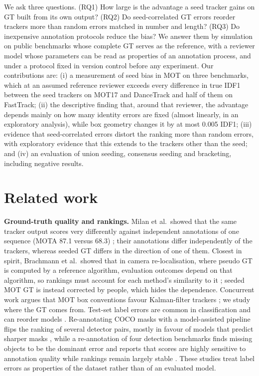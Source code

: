\documentclass[final,times,twocolumn]{elsarticle}
\begin{document}
We ask three questions. (RQ1) How large is the advantage a seed tracker gains on GT built from its own
output? (RQ2) Do seed-correlated GT errors reorder trackers more than random errors matched in number and
length? (RQ3) Do inexpensive annotation protocols reduce the bias? We answer them by simulation on public
benchmarks whose complete GT serves as the reference, with a reviewer model whose parameters can be read
as properties of an annotation process, and under a protocol fixed in version control before any
experiment. Our contributions are: (i) a measurement of seed bias in MOT on three benchmarks, which at an
assumed reference reviewer exceeds every difference in true IDF1 between the seed trackers on MOT17 and
DanceTrack and half of them on FastTrack; (ii) the descriptive finding that, around that reviewer, the
advantage depends mainly on how many identity errors are fixed (almost linearly, in an exploratory
analysis), while box geometry changes it by at most 0.005 IDF1; (iii) evidence that seed-correlated errors
distort the ranking more than random errors, with exploratory evidence that this extends to the trackers
other than the seed; and (iv) an evaluation of union seeding, consensus seeding and bracketing, including
negative results.

\section{Related work}
\label{sec:related}

\textbf{Ground-truth quality and rankings.} Milan et al.\ showed that the same tracker output scores very
differently against independent annotations of one sequence (MOTA 87.1 versus 68.3)
\cite{milan2013challenges}; their annotations differ independently of the trackers, whereas seeded GT
differs in the direction of one of them. Closest in spirit, Brachmann et al.\ showed that in camera
re-localisation, where pseudo GT is computed by a reference algorithm, evaluation outcomes depend on that
algorithm, so rankings must account for each method's similarity to it \cite{brachmann2021pseudo}; seeded MOT GT
is instead corrected by people, which hides the dependence. Concurrent work argues that MOT box conventions
favour Kalman-filter trackers \cite{rocky2026ash}; we study where the GT comes from. Test-set label errors are common
in classification and can reorder models \cite{northcutt2021pervasive}. Re-annotating COCO masks with a
model-assisted pipeline flips the ranking of several detector pairs, mostly in favour of models that
predict sharper masks \cite{singh2024cocorem}, while a re-annotation of four detection benchmarks finds
missing objects to be the dominant error and reports that scores are highly sensitive to annotation
quality while rankings remain largely stable \cite{penquitt2026incomplete}. These studies treat label
errors as properties of the dataset rather than of an evaluated model.
\end{document}

